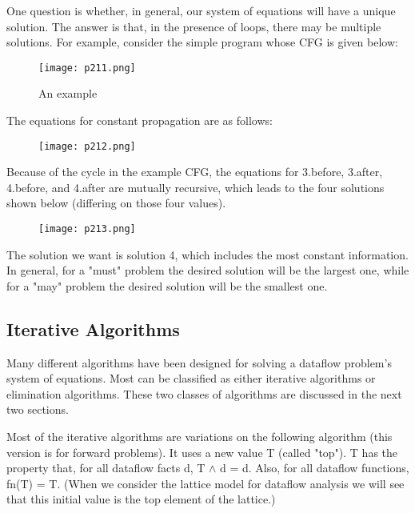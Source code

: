 One question is whether, in general, our system of equations will have
a unique solution. The answer is that, in the presence of loops, there may
be multiple solutions. For example, consider the simple program whose CFG is
given below:



\begin{figure}[H]
	\centering
	\texttt{[image: p211.png]}
	\caption{An example}
	\label{fig:p211}
\end{figure}

The equations for constant propagation are as follows:

\begin{figure}[H]
	\centering
	\texttt{[image: p212.png]}
	\caption{}
	\label{fig:p212}
\end{figure}


Because of the cycle in the example CFG, the equations for 3.before,
3.after, 4.before, and 4.after are mutually recursive, which leads to the
four solutions shown below (differing on those four values).

\begin{figure}[H]
	\centering
	\texttt{[image: p213.png]}
	\caption{}
	\label{fig:p213}
\end{figure}

The solution we want is solution 4, which includes the most constant
information. In general, for a "must" problem the desired solution will be
the largest one,
while for a "may" problem the desired solution will be the smallest one.


\subsection{Iterative Algorithms}

Many different algorithms have been designed for solving a dataflow
problem's system of equations. Most can be classified as either
iterative algorithms or elimination algorithms. These two classes
of algorithms are discussed in the next two sections.


Most of the iterative algorithms are variations on the following
algorithm (this version is for forward problems). It uses a new
value T (called "top"). T has the property that, for all dataflow
facts d, T $\wedge$ d = d. Also, for all dataflow functions, fn(T) = T.
(When we consider the lattice model for dataflow analysis we
will see that this initial value is the top element of the lattice.)



